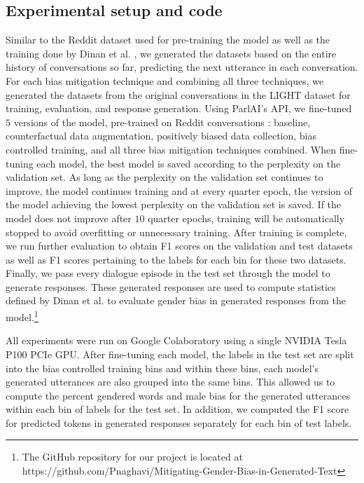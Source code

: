 \subsection{Experimental setup and code}
Similar to the Reddit dataset used for pre-training the model as well as the training done by Dinan et al. \supercite{dinan2020}, we generated the datasets based on the entire history of conversations so far, predicting the next utterance in each conversation. For each bias mitigation technique and combining all three techniques, we generated the datasets from the original conversations in the LIGHT dataset \supercite{urbanek2019} for training, evaluation, and response generation. Using ParlAI’s API, we fine-tuned $5$ versions of the model, pre-trained on Reddit conversations \supercite{redditmodel}: baseline, counterfactual data augmentation, positively biased data collection, bias controlled training, and all three bias mitigation techniques combined. When fine-tuning each model, the best model is saved according to the perplexity on the validation set. As long as the perplexity on the validation set continues to improve, the model continues training and at every quarter epoch, the version of the model achieving the lowest perplexity on the validation set is saved. If the model does not improve after $10$ quarter epochs, training will be automatically stopped to avoid overfitting or unnecessary training. After training is complete, we run further evaluation to obtain F1 scores on the validation and test datasets as well as F1 scores pertaining to the labels for each bin for these two datasets. Finally, we pass every dialogue episode in the test set through the model to generate responses. These generated responses are used to compute statistics defined by Dinan et al. \supercite{dinan2020} to evaluate gender bias in generated responses from the model.\footnote{The GitHub repository for our project is located at https://github.com/Pnaghavi/Mitigating-Gender-Bias-in-Generated-Text}

All experiments were run on Google Colaboratory using a single NVIDIA Tesla P100 PCIe GPU. After fine-tuning each model, the labels in the test set are split into the bias controlled training bins and within these bins, each model’s generated utterances are also grouped into the same bins. This allowed us to compute the percent gendered words and male bias for the generated utterances within each bin of labels for the test set. In addition, we computed the F1 score for predicted tokens in generated responses separately for each bin of test labels.

